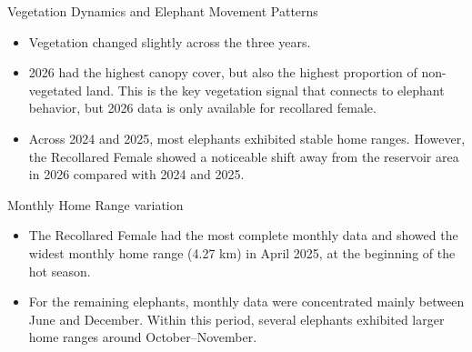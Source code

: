 \documentclass{beamer}
\begin{document}
		
		
		
		\begin{frame}{Vegetation Dynamics and Elephant Movement Patterns}
			\begin{itemize}
				\item Vegetation changed slightly across the three years.
				
				\vspace{0.5cm}
				
				\item 2026 had the highest canopy cover, but also the highest proportion of
				non-vegetated land. This is the key vegetation signal that connects
				to elephant behavior, but 2026 data is only available for recollared
				female.
				
				\vspace{0.5cm}
				
				\item Across 2024 and 2025, most elephants exhibited stable home ranges. However, the Recollared Female showed a noticeable shift away from the reservoir area in 2026 compared with 2024 and 2025.
				
			\end{itemize}
		\end{frame}
		
		
		
		
		
		\begin{frame}{Monthly Home Range variation}
			\begin{itemize}
				\item The Recollared Female had the most complete monthly data and showed the widest monthly home range (4.27 km) in April 2025, at the beginning of the hot season. 
				
				\vspace{0.5cm}
				
				\item For the remaining elephants, monthly data were concentrated mainly between June and December. Within this period, several elephants exhibited larger home ranges around October–November.
			\end{itemize}
		
	\end{frame}
	
	
	
	
\end{document}
